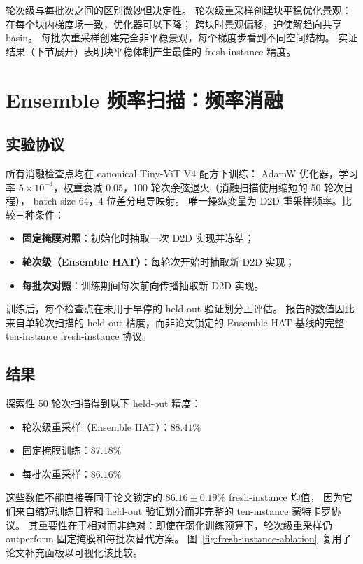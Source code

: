 轮次级与每批次之间的区别微妙但决定性。
轮次级重采样创建块平稳优化景观：在每个块内梯度场一致，优化器可以下降；
跨块时景观偏移，迫使解趋向共享 basin。
每批次重采样创建完全非平稳景观，每个梯度步看到不同空间结构。
实证结果（下节展开）表明块平稳体制产生最佳的 fresh-instance 精度。

\section{Ensemble 频率扫描：频率消融}
\label{sec:frequency-sweep}

\subsection{实验协议}

所有消融检查点均在 canonical Tiny-ViT V4 配方下训练：
AdamW 优化器，学习率 $5\times10^{-4}$，权重衰减 $0.05$，100 轮次余弦退火（消融扫描使用缩短的 50 轮次日程），
batch size 64，4 位差分电导映射。
唯一操纵变量为 D2D 重采样频率。比较三种条件：
\begin{itemize}[leftmargin=1.4em]
    \item \textbf{固定掩膜对照}：初始化时抽取一次 D2D 实现并冻结；
    \item \textbf{轮次级（Ensemble HAT）}：每轮次开始时抽取新 D2D 实现；
    \item \textbf{每批次对照}：训练期间每次前向传播抽取新 D2D 实现。
\end{itemize}

训练后，每个检查点在未用于早停的 held-out 验证划分上评估。
报告的数值因此来自单轮次扫描的 held-out 精度，而非论文锁定的 Ensemble HAT 基线的完整 ten-instance fresh-instance 协议。

\subsection{结果}

探索性 50 轮次扫描得到以下 held-out 精度：
\begin{itemize}[leftmargin=1.4em]
    \item 轮次级重采样（Ensemble HAT）：$\mathbf{88.41\%}$
    \item 固定掩膜训练：$\mathbf{87.18\%}$
    \item 每批次重采样：$\mathbf{86.16\%}$
\end{itemize}

这些数值不能直接等同于论文锁定的 $86.16\pm0.19\%$ fresh-instance 均值，
因为它们来自缩短训练日程和 held-out 验证划分而非完整的 ten-instance 蒙特卡罗协议。
其重要性在于相对而非绝对：即使在弱化训练预算下，轮次级重采样仍 outperform 固定掩膜和每批次替代方案。
图~\ref{fig:fresh-instance-ablation}~复用了论文补充面板以可视化该比较。

